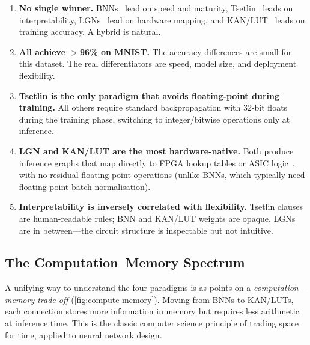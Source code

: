 \begin{enumerate}[leftmargin=2em]
  \item \textbf{No single winner.} BNNs~\cite{courbariaux2016bnn} lead on speed and maturity,
    Tsetlin~\cite{granmo2018tsetlin} leads on interpretability, LGNs~\cite{petersen2022difflogic} lead on hardware mapping,
    and KAN/LUT~\cite{liu2024kan} leads on training accuracy. A hybrid is natural.

  \item \textbf{All achieve $>$96\% on MNIST.} The accuracy differences
    are small for this dataset. The real differentiators are speed,
    model size, and deployment flexibility.

  \item \textbf{Tsetlin is the only paradigm that avoids
    floating-point during training.} All others require standard
    backpropagation with 32-bit floats during the training phase,
    switching to integer/bitwise operations only at inference.

  \item \textbf{LGN and KAN/LUT are the most hardware-native.}
    Both produce inference graphs that map directly to FPGA lookup
    tables or ASIC logic~\cite{polylut2023, bnnfpga2025}, with no residual floating-point operations
    (unlike BNNs, which typically need floating-point batch
    normalisation).

  \item \textbf{Interpretability is inversely correlated with
    flexibility.} Tsetlin clauses are human-readable rules;
    BNN and KAN/LUT weights are opaque. LGNs are in between---the
    circuit structure is inspectable but not intuitive.
\end{enumerate}

\subsection{The Computation--Memory Spectrum}

A unifying way to understand the four paradigms is as points on a
\emph{computation--memory trade-off} (\cref{fig:compute-memory}).
Moving from BNNs to KAN/LUTs, each connection stores more information
in memory but requires less arithmetic at inference time. This is the
classic computer science principle of trading space for time, applied
to neural network design.

